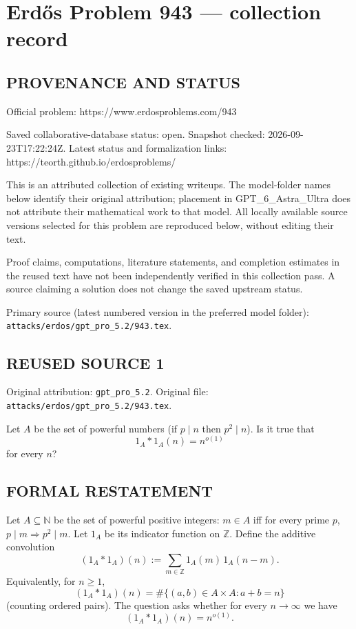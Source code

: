 \section*{Erd\H{o}s Problem 943 --- collection record}

\subsection*{PROVENANCE AND STATUS}
Official problem: https://www.erdosproblems.com/943

Saved collaborative-database status: open.
Snapshot checked: 2026-09-23T17:22:24Z.
Latest status and formalization links: https://teorth.github.io/erdosproblems/

This is an attributed collection of existing writeups. The model-folder names below identify their original attribution; placement in GPT\_6\_Astra\_Ultra does not attribute their mathematical work to that model. All locally available source versions selected for this problem are reproduced below, without editing their text.

Proof claims, computations, literature statements, and completion estimates in the reused text have not been independently verified in this collection pass. A source claiming a solution does not change the saved upstream status.

Primary source (latest numbered version in the preferred model folder): \texttt{attacks/erdos/gpt\_pro\_5.2/943.tex}.

\subsection*{REUSED SOURCE 1}
Original attribution: \texttt{gpt\_pro\_5.2}.
Original file: \texttt{attacks/erdos/gpt\_pro\_5.2/943.tex}.


Let $A$ be the set of powerful numbers (if $p\mid n$ then $p^2\mid n$). Is it true that\[1_A\ast 1_A(n)=n^{o(1)}\]for every $n$?

\subsection*{FORMAL RESTATEMENT}
Let $A\subseteq\mathbb{N}$ be the set of powerful positive integers: $m\in A$ iff for every prime $p$, $p\mid m\Rightarrow p^2\mid m$. Let $1_A$ be its indicator function on $\mathbb{Z}$.
Define the additive convolution
\[
(1_A*1_A)(n) := \sum_{m\in\mathbb{Z}} 1_A(m)\,1_A(n-m).
\]
Equivalently, for $n\ge 1$,
\[
(1_A*1_A)(n)=\#\{(a,b)\in A\times A: a+b=n\}
\]
(counting ordered pairs).
The question asks whether for every $n\to\infty$ we have
\[
(1_A*1_A)(n)=n^{o(1)}.
\]

